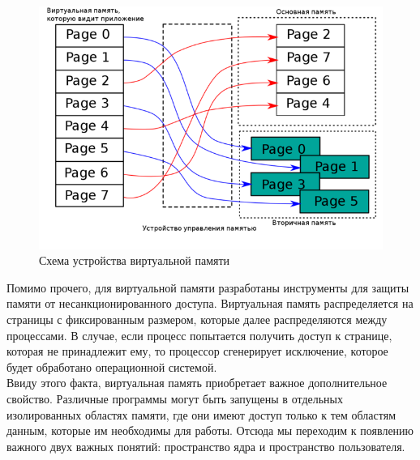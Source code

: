 \begin{figure}[H]
    \centering
    \includegraphics[scale=0.5,width=\textwidth]{inc/img/virt_mem}
    \caption{Схема устройства виртуальной памяти\cite{virt-mem-pic}}
    \label{fig:virt_mem}
\end{figure}


Помимо прочего, для виртуальной памяти разработаны инструменты для защиты памяти от несанкционированного доступа.
Виртуальная память распределяется на страницы с фиксированным размером, которые далее распределяются между процессами.
В случае, если процесс попытается получить доступ к странице, которая не принадлежит ему, то процессор сгенерирует исключение, которое будет обработано операционной системой.
\\
Ввиду этого факта, виртуальная память приобретает важное дополнительное свойство.
Различные программы могут быть запущены в отдельных изолированных областях памяти, где они имеют доступ только к тем областям данным,
которые им необходимы для работы.
Отсюда мы переходим к появлению важного двух важных понятий: пространство ядра и пространство пользователя.
\newpage
